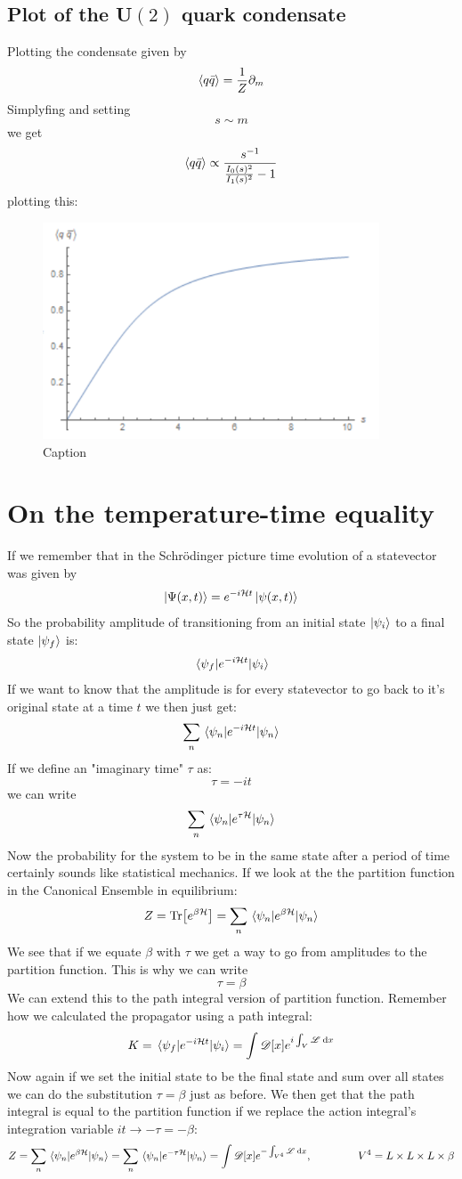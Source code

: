 \documentclass[a4,10pt,titlepage]{article}
\renewcommand\[{\begin{equation*}}
\renewcommand\]{\end{equation*}}
\newcommand{\be}{\begin{equation}}
\newcommand{\ee}{\end{equation}}
\numberwithin{equation}{section}
\newcommand{\PD}{\mathscr{D}}
\newcommand{\ham}{\mathcal{H}}
\newcommand{\Lar}{\mathscr{L}}
\begin{document}
\subsection{Plot of the U$(2)$ quark condensate}
Plotting the condensate given by 
\be
\expval{q\bar q}=\frac{1}{Z}\partial_m
\ee
Simplyfing and setting 
\[
s\sim m
\]
we get
\be
\expval{q\bar q}\propto\frac{s^{-1}}{\frac{I_0(s)^2}{I_1(s)^2}-1}
\ee
plotting this:
\begin{figure}
    \centering
    \includegraphics[width=10cm]{Capture.PNG}
    \caption{Caption}
    \label{fig:my_label}
\end{figure}
\section{On the temperature-time equality}
If we remember that in the Schrödinger picture time evolution of a statevector was given by
\be
\ket{\Psi(x,t)}=e^{-i\ham t}\ket{\psi(x,t)}
\ee
So the probability amplitude of transitioning from an initial state $\ket{\psi_i}$ to a final state $\ket{\psi_f}$ is:
\[
\mel{\psi_f}{e^{-i\ham t}}{\psi_i}
\]
If we want to know that the amplitude is for every statevector to go back to it's original state at a time $t$ we then just get:
\[
\sum_n\mel{\psi_n}{e^{-i \ham t}}{\psi_n}
\]
If we define an "imaginary time" $\tau$ as:
\[
\tau =-i t
\]
we can write
\be
\sum_n\mel{\psi_n}{e^{\tau \ham}}{\psi_n}
\ee
Now the probability for the system to be in the same state after a period of time certainly sounds like statistical mechanics. If we look at the the partition function in the Canonical Ensemble in equilibrium:
\be
Z=\Tr[e^{\beta \ham}]=\sum_n \mel{\psi_n}{e^{\beta \ham}}{\psi_n}
\ee
We see that if we equate $\beta$ with $\tau$ we get a way to go from amplitudes to the partition function. This is why we can write
\[
\tau=\beta
\]
We can extend this to the path integral version of partition function. Remember how we calculated the propagator using a path integral:
\[
K=\mel{\psi_f}{e^{-i\ham t}}{\psi_i}=\int \PD[x]e^{i\int_V\Lar \:\dd x}
\]
Now again if we set the initial state to be the final state and sum over all states we can do the substitution $\tau=\beta$ just as before. We then get that the path integral is equal to the partition function if we replace the action integral's integration variable $it\rightarrow -\tau =-\beta$:
\[
Z=\sum_n\mel{\psi_n}{e^{\beta\ham}}{\psi_n}=\sum_n\mel{\psi_n}{e^{-\tau\ham}}{\psi_n}=\int \PD[x]e^{-\int_{V^4}\Lar \:\dd x},\hspace*{1.5cm}V^4=L\times L \times L \times \beta
\]
\end{document}
